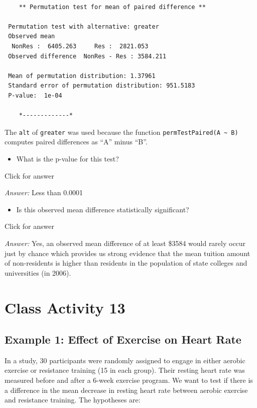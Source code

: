\documentclass[
]{book}
\providecommand{\tightlist}{%
  \setlength{\itemsep}{0pt}\setlength{\parskip}{0pt}}
\begin{document}
\begin{verbatim}

    ** Permutation test for mean of paired difference **

 Permutation test with alternative: greater 
 Observed mean
  NonRes :  6405.263     Res :  2821.053 
 Observed difference  NonRes - Res : 3584.211 

 Mean of permutation distribution: 1.37961 
 Standard error of permutation distribution: 951.5183 
 P-value:  1e-04 

    *-------------*
\end{verbatim}

The \texttt{alt} of \texttt{greater} was used because the function \texttt{permTestPaired(A\ \textasciitilde{}\ B)} computes paired differences as ``A'' minus ``B''.

\begin{itemize}
\tightlist
\item
  What is the p-value for this test?
\end{itemize}

Click for answer

\emph{Answer:} Less than 0.0001

\begin{itemize}
\tightlist
\item
  Is this observed mean difference statistically significant?
\end{itemize}

Click for answer

\emph{Answer:} Yes, an observed mean difference of at least \$3584 would rarely occur just by chance which provides us strong evidence that the mean tuition amount of non-residents is higher than residents in the population of state colleges and universities (in 2006).

\hypertarget{class-activity-13}{%
\chapter{Class Activity 13}\label{class-activity-13}}

\hypertarget{example-1-effect-of-exercise-on-heart-rate}{%
\section{Example 1: Effect of Exercise on Heart Rate}\label{example-1-effect-of-exercise-on-heart-rate}}

In a study, 30 participants were randomly assigned to engage in either aerobic exercise or resistance training (15 in each group). Their resting heart rate was measured before and after a 6-week exercise program. We want to test if there is a difference in the mean decrease in resting heart rate between aerobic exercise and resistance training. The hypotheses are:
\end{document}
